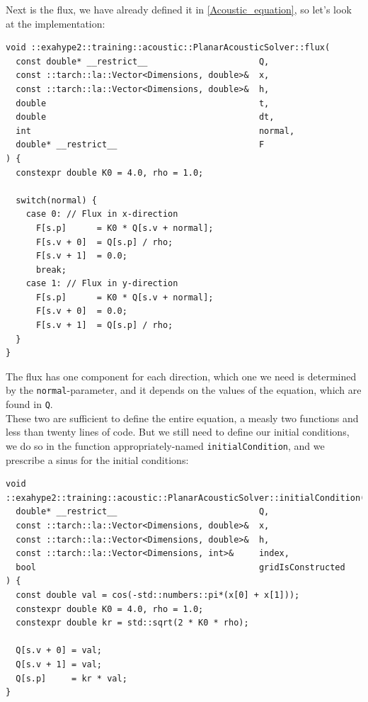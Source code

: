 \documentclass[12pt,letterpaper]{article}
\begin{document}
\newpage

Next is the flux, we have already defined it in \ref{Acoustic_equation}, so let's look at the implementation:\\

\begin{lstlisting}[style = C++]
void ::exahype2::training::acoustic::PlanarAcousticSolver::flux(
  const double* __restrict__                      Q,
  const ::tarch::la::Vector<Dimensions, double>&  x,
  const ::tarch::la::Vector<Dimensions, double>&  h,
  double                                          t,
  double                                          dt,
  int                                             normal,
  double* __restrict__                            F
) {
  constexpr double K0 = 4.0, rho = 1.0;

  switch(normal) {
    case 0: // Flux in x-direction
      F[s.p]      = K0 * Q[s.v + normal];
      F[s.v + 0]  = Q[s.p] / rho;
      F[s.v + 1]  = 0.0;
      break;
    case 1: // Flux in y-direction
      F[s.p]      = K0 * Q[s.v + normal];
      F[s.v + 0]  = 0.0;
      F[s.v + 1]  = Q[s.p] / rho;
  }
}
\end{lstlisting}

The flux has one component for each direction, which one we need is determined by the \texttt{normal}-parameter,
and it depends on the values of the equation, which are found in \texttt{Q}.\\
These two are sufficient to define the entire equation, a measly two functions and less than twenty lines of code.
But we still need to define our initial conditions, we do so in the function appropriately-named \texttt{initialCondition},
and we prescribe a sinus for the initial conditions:\\

\begin{lstlisting}[style = C++]
void ::exahype2::training::acoustic::PlanarAcousticSolver::initialCondition(
  double* __restrict__                            Q,
  const ::tarch::la::Vector<Dimensions, double>&  x,
  const ::tarch::la::Vector<Dimensions, double>&  h,
  const ::tarch::la::Vector<Dimensions, int>&     index,
  bool                                            gridIsConstructed
) {
  const double val = cos(-std::numbers::pi*(x[0] + x[1]));
  constexpr double K0 = 4.0, rho = 1.0;
  constexpr double kr = std::sqrt(2 * K0 * rho);

  Q[s.v + 0] = val;
  Q[s.v + 1] = val;
  Q[s.p]     = kr * val;
}
\end{lstlisting}
\end{document}
